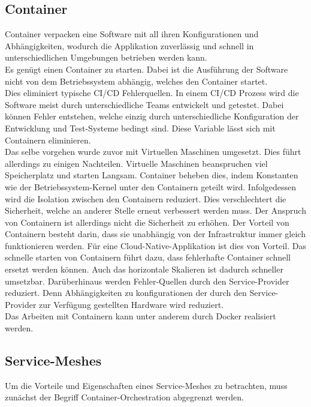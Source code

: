\subsection{Container}
Container verpacken eine Software mit all ihren Konfigurationen und Abhängigkeiten, wodurch die Applikation zuverlässig und schnell in unterschiedlichen Umgebungen betrieben werden kann.\\
Es genügt einen Container zu starten. Dabei ist die Ausführung der Software nicht von dem Betriebssystem abhängig, welches den Container startet.\\
Dies eliminiert typische CI/CD Fehlerquellen. In einem CI/CD Prozess wird die Software meist durch unterschiedliche Teams entwickelt und getestet. Dabei können Fehler entstehen, welche einzig durch unterschiedliche Konfiguration der Entwicklung und Test-Systeme bedingt sind. Diese Variable lässt sich mit Containern eliminieren.\\
Das selbe vorgehen wurde zuvor mit Virtuellen Maschinen umgesetzt. Dies führt allerdings zu einigen Nachteilen. Virtuelle Maschinen beanspruchen viel Speicherplatz und starten Langsam. Container beheben dies, indem Konstanten wie der Betriebssystem-Kernel unter den Containern geteilt wird. Infolgedessen wird die Isolation zwischen den Containern reduziert. Dies verschlechtert die Sicherheit, welche an anderer Stelle erneut verbessert werden muss. Der Anspruch von Containern ist allerdings nicht die Sicherheit zu erhöhen. Der Vorteil von Containern besteht darin, dass sie unabhängig von der Infrastruktur immer gleich funktionieren werden. Für eine Cloud-Native-Applikation ist dies von Vorteil. Das schnelle starten von Containern führt dazu, dass fehlerhafte Container schnell ersetzt werden können. Auch das horizontale Skalieren ist dadurch schneller umsetzbar. Darüberhinaus werden Fehler-Quellen durch den Service-Provider reduziert. Denn Abhängigkeiten zu konfigurationen der durch den Service-Provider zur Verfügung gestellten Hardware wird reduziert.\\
Das Arbeiten mit Containern kann unter anderem durch Docker realisiert werden. 

\subsection{Service-Meshes}
Um die Vorteile und Eigenschaften eines Service-Meshes zu betrachten, muss zunächst der Begriff Container-Orchestration abgegrenzt werden.

